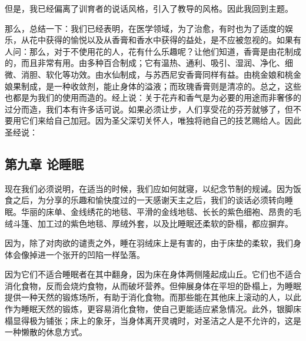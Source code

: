 但是，我已经偏离了训育者的说话风格，引入了教导的风格。因此我回到主题。\par

那么，总结一下：我们已经表明，在医学领域，为了治愈，有时也为了适度的娱乐，从花中获得的愉悦以及从香膏和香水中获得的益处，是不应被忽视的。如果有人问：那么，对于不使用花的人，花有什么乐趣呢？让他们知道，香膏是由花制成的，而且非常有用。由多种百合制成；它有温热、通利、吸引、湿润、净化、细微、消胆、软化等功效。由水仙制成，与苏西尼安香膏同样有益。由桃金娘和桃金娘果制成，是一种收敛剂，能止身体的溢液；而玫瑰香膏则是清凉的。总之，这些也都是为我们的使用而造的。经上说：关于花卉和香气是为必要的用途而非奢侈的过分而造，我们本有许多话可说。如果必须让步，人们享受花的芬芳就够了，但不要用它们来给自己加冠。因为圣父深切关怀人，唯独将祂自己的技艺赐给人。因此圣经说：\par


\subsection{第九章 论睡眠}

现在我们必须说明，在适当的时候，我们应如何就寝，以纪念节制的规诫。因为饭食之后，为分享的乐趣和愉快度过的一天感谢天主之后，我们的谈话必须转向睡眠。华丽的床单、金线绣花的地毯、平滑的金线地毯、长长的紫色细袍、昂贵的毛绒斗篷、加工过的紫色地毯、厚绒外套，以及比睡眠还柔软的卧榻，都应摒弃。\par

因为，除了对肉欲的谴责之外，睡在羽绒床上是有害的，由于床垫的柔软，我们身体会像掉进一个张开的凹陷一样坠落。\par

因为它们不适合睡眠者在其中翻身，因为床在身体两侧隆起成山丘。它们也不适合消化食物，反而会烧灼食物，从而破坏营养。但伸展身体在平坦的卧榻上，为睡眠提供一种天然的锻炼场所，有助于消化食物。而那些能在其他床上滚动的人，以此作为睡眠天然的锻炼，更容易消化食物，使自己更能适应紧急情况。此外，银脚床榻显得极为铺张；床上的象牙，当身体离开灵魂时，对圣洁之人是不允许的，这是一种懒散的休息方式。\par

